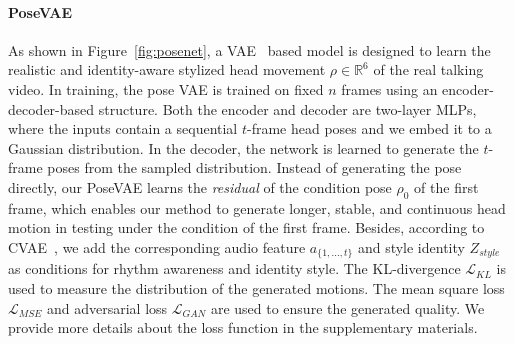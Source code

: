 \paragraph{PoseVAE}
As shown in Figure~\ref{fig:posenet}, a VAE~\cite{vae} based model is designed to learn the realistic and identity-aware stylized head movement $ \rho \in \mathbb{R}^6$ of the real talking video. In training, the pose VAE is trained on fixed $n$ frames using an encoder-decoder-based structure. Both the encoder and decoder are two-layer MLPs, where the inputs contain a sequential $t$-frame head poses and we embed it to a Gaussian distribution. In the decoder, the network is learned to generate the $t$-frame poses from the sampled distribution. Instead of generating the pose directly, our PoseVAE learns the \textit{residual} of the condition pose $\rho_0$ of the first frame, which enables our method to generate longer, stable, and continuous head motion in testing under the condition of the first frame. 
Besides, according to CVAE~\cite{cvae}, we add the corresponding audio feature $a_{\{1, ..., t\}}$ and style identity $Z_{style}$ as conditions for rhythm awareness and identity style. The KL-divergence $\mathcal{L}_{KL}$ is used to measure the distribution of the generated motions. The mean square loss $\mathcal{L}_{MSE}$ and adversarial loss $\mathcal{L}_{GAN}$ are used to ensure the generated quality. We provide more details about the loss function in the supplementary materials.




